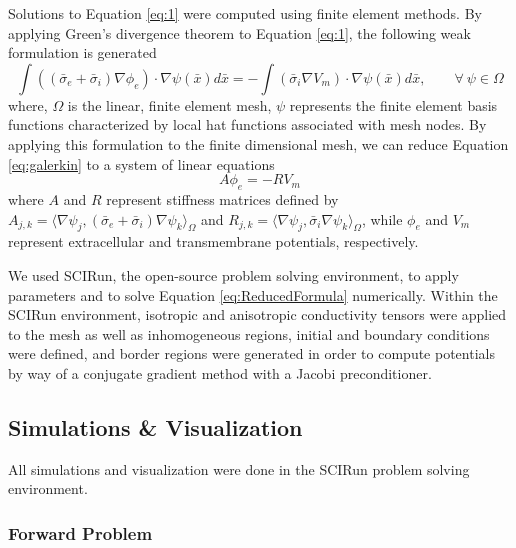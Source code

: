 
Solutions to Equation \ref{eq:1} were computed using finite element methods.  By applying 
Green's divergence theorem to Equation \ref{eq:1}, the following weak formulation is generated 
\begin{equation}
\int ((\bar{\sigma}_e + \bar{\sigma}_i)\nabla \phi_e) \cdot \nabla \psi(\bar{x})d\bar{x} = - \int (\bar{\sigma}
_i \nabla V_m)\cdot \nabla \psi(\bar{x})d\bar{x}, \quad \quad \forall \ \psi \in \Omega
\label{eq:galerkin}
\end{equation}
where, $\Omega$ is the linear, finite element mesh, $\psi$ represents the finite element basis functions characterized by local hat functions associated with mesh nodes. By applying this formulation to the finite dimensional mesh, we can reduce Equation \ref{eq:galerkin} to a system of linear equations 
\begin{equation}
A \phi_e = -RV_m
\label{eq:ReducedFormula}
\end{equation}
where $A$ and $R$ represent stiffness matrices defined by $A_{j,k} = \langle \nabla \psi_j,(\bar{\sigma}
_e + \bar{\sigma}_i)\nabla \psi_k \rangle_\Omega$ and $R_{j,k} = \langle \nabla \psi_j,\bar{\sigma}_i
\nabla \psi_k \rangle_\Omega$,
while $\phi_e$ and $V_m$ represent extracellular and transmembrane potentials, respectively.\cite{BMB:Wan2013}

We used SCIRun, the open-source problem solving environment, to apply parameters and to solve Equation  \ref{eq:ReducedFormula} numerically.  Within the SCIRun environment, isotropic and anisotropic conductivity tensors were applied to the mesh as well as inhomogeneous regions, initial and boundary conditions were defined, and border regions were generated in order to compute potentials by way of a conjugate gradient method with a Jacobi preconditioner.

\subsection{Simulations \& Visualization}
\label{sec:sim}

All simulations and visualization were done in the SCIRun problem solving environment.

\subsubsection{Forward Problem}

